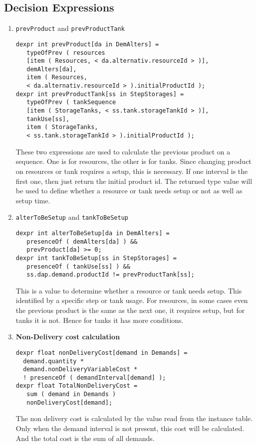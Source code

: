 \documentclass[a4paper, 12pt]{article}
\begin{document}
\subsection{Decision Expressions}
\begin{enumerate}
\item \texttt{prevProduct} and \texttt{prevProductTank}
\begin{lstlisting}
dexpr int prevProduct[da in DemAlters] = 
   typeOfPrev ( resources
   [item ( Resources, < da.alternativ.resourceId > )], 
   demAlters[da], 
   item ( Resources, 
   < da.alternativ.resourceId > ).initialProductId );
dexpr int prevProductTank[ss in StepStorages] = 
   typeOfPrev ( tankSequence
   [item ( StorageTanks, < ss.tank.storageTankId > )], 
   tankUse[ss], 
   item ( StorageTanks, 
   < ss.tank.storageTankId > ).initialProductId );
\end{lstlisting}
These two expressions are used to calculate the previous product on a sequence. One is for resources, the other is for tanks. Since changing product on resources or tank requires a setup, this is necessary. If one interval is the first one, then just return the initial product id. The returned type value will be used to define whether a resource or tank needs setup or not as well as setup time. 
\item \texttt{alterToBeSetup} and \texttt{tankToBeSetup}
\begin{lstlisting}
dexpr int alterToBeSetup[da in DemAlters] = 
   presenceOf ( demAlters[da] ) && 
   prevProduct[da] >= 0;
dexpr int tankToBeSetup[ss in StepStorages] = 
   presenceOf ( tankUse[ss] ) && 
   ss.dap.demand.productId != prevProductTank[ss];
\end{lstlisting}
This is a value to determine whether a resource or tank needs setup. This identified by a specific step or tank usage. For resources, in some cases even the previous product is the same as the next one, it requires setup, but for tanks it is not. Hence for tanks it has more conditions. 
\item \textbf{Non-Delivery cost calculation}
\begin{lstlisting}
dexpr float nonDeliveryCost[demand in Demands] = 
  demand.quantity * 
  demand.nonDeliveryVariableCost * 
  ! presenceOf ( demandInterval[demand] );
dexpr float TotalNonDeliveryCost = 
   sum ( demand in Demands )
   nonDeliveryCost[demand];
\end{lstlisting}
The non delivery cost is calculated by the value read from the instance table. Only when the demand interval is not present, this cost will be calculated. And the total cost is the sum of all demands. 

\end{enumerate}
\end{document}
